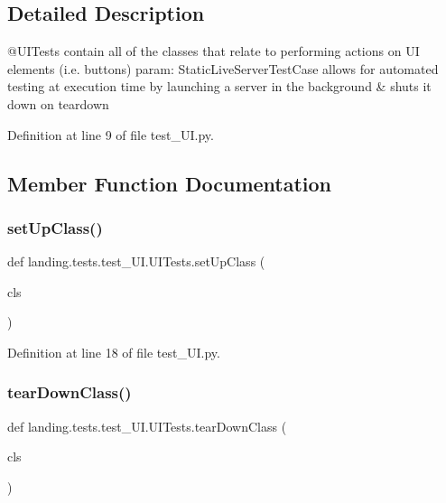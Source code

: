 \subsection{Detailed Description}
\begin{DoxyVerb}@UITests contain all of the classes that relate to performing actions on UI elements (i.e. buttons)
param: StaticLiveServerTestCase allows for automated testing
at execution time by launching a server in the background &
shuts it down on teardown
\end{DoxyVerb}
 

Definition at line 9 of file test\+\_\+\+U\+I.\+py.



\subsection{Member Function Documentation}
\mbox{\label{classlanding_1_1tests_1_1test__UI_1_1UITests_a63dc03589cdac58df8716fbb1fb3279b}} 
\subsubsection{\texorpdfstring{set\+Up\+Class()}{setUpClass()}}
{\footnotesize\ttfamily def landing.\+tests.\+test\+\_\+\+U\+I.\+U\+I\+Tests.\+set\+Up\+Class (\begin{DoxyParamCaption}\item[{}]{cls }\end{DoxyParamCaption})}



Definition at line 18 of file test\+\_\+\+U\+I.\+py.

\mbox{\label{classlanding_1_1tests_1_1test__UI_1_1UITests_a2d3a96bc34095bed7567d567563e8d82}} 
\subsubsection{\texorpdfstring{tear\+Down\+Class()}{tearDownClass()}}
{\footnotesize\ttfamily def landing.\+tests.\+test\+\_\+\+U\+I.\+U\+I\+Tests.\+tear\+Down\+Class (\begin{DoxyParamCaption}\item[{}]{cls }\end{DoxyParamCaption})}



